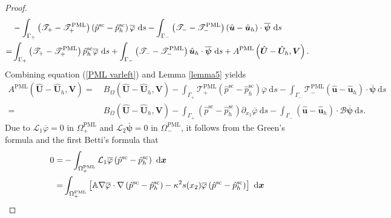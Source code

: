 \documentclass[10pt,a4paper]{amsart}
\begin{document}
\begin{proof}
\begin{align}
		&-\int_{\Gamma_+}\left(\mathscr{T}_+-\mathscr{T}_+^{\mathrm{PML}}\right)\left(\hat{p}^{\mathrm{sc}}-\hat{p}^{\mathrm{sc}}_h\right) \overline{\varphi} \mathrm{~d} s
		-\int_{\Gamma_-}\left(\mathscr{T}_--\mathscr{T}_-^{\mathrm{PML}}\right)\left(\hat{\boldsymbol{u}}-\hat{\boldsymbol{u}}_h\right) \cdot \overline{\boldsymbol{\psi}} \mathrm{~d} s \notag\\
		=&\int_{\Gamma_+}\left(\mathscr{T}_+-\mathscr{T}_+^{\mathrm{PML}}\right)\hat{p}^{\mathrm{sc}}_h \overline{\varphi} \mathrm{~d} s
		+\int_{\Gamma_-}\left(\mathscr{T}_--\mathscr{T}_-^{\mathrm{PML}}\right)\hat{\boldsymbol{u}}_h \cdot \overline{\boldsymbol{\psi}} \mathrm{~d} s +A^{\mathrm{PML}}\left(\hat{\boldsymbol{U}}-\hat{\boldsymbol{U}}_h, \boldsymbol{V}\right).\label{4.2.1}
	\end{align}
	Combining equation (\ref{PML varleft}) and Lemma \ref{lemma5} yields
	\begin{align*}
		A^{\mathrm{PML}}\left(\hat{\boldsymbol{U}}-\hat{\boldsymbol{U}}_h,\boldsymbol{V}\right)
		=&~B_{\Omega}\left(\hat{\boldsymbol{U}}-\hat{\boldsymbol{U}}_h, \boldsymbol{V}\right) -\int_{\Gamma_+}\mathscr{T}_+^{\mathrm{PML}}\left(\hat{p}^{\mathrm{sc}}-\hat{p}^{\mathrm{sc}}_h\right) \overline{\varphi} \mathrm{~d} s
		-\int_{\Gamma_-}\mathscr{T}_-^{\mathrm{PML}}\left(\hat{\boldsymbol{u}}-\hat{\boldsymbol{u}}_h\right) \cdot \overline{\boldsymbol{\psi}} \mathrm{~d} s\\
		=&~B_{\Omega}\left(\hat{\boldsymbol{U}}-\hat{\boldsymbol{U}}_h, \boldsymbol{V}\right) 
		- \int_{\Gamma_+}\left(\hat{p}^{\mathrm{sc}}-\hat{p}^{\mathrm{sc}}_h\right) \partial_{x_2} \overline{\varphi} \mathrm{~d} s
		- \int_{\Gamma_-} \left(\hat{\boldsymbol{u}}-\hat{\boldsymbol{u}}_h\right) \cdot \mathscr{B} \overline{\boldsymbol{\psi}} \mathrm{~d} s.
	\end{align*}
	Due to $\mathcal{L}_1 \overline{\varphi}=0$ in $\Omega^{\mathrm{PML}}_+$ and $\mathcal{L}_2 \overline{\boldsymbol{\psi}}=0$ in $\Omega^{\mathrm{PML}}_-$, it follows from the Green's formula and the first Betti's formula that
	\begin{align*}
		0 =& -\int_{\Omega^{\mathrm{PML}}_+}	\mathcal{L}_1\overline{\varphi}\left(\hat{p}^{\mathrm{sc}}-\hat{p}^{\mathrm{sc}}_h\right) \mathrm{~d} \boldsymbol{x} \notag\\
		=& \int_{\Omega^{\mathrm{PML}}_+}\left[\mathbb{A}\nabla \overline{\varphi} \cdot \nabla  \left(\hat{p}^{\mathrm{sc}}-\hat{p}^{\mathrm{sc}}_h\right)   
		- \kappa^2 s(x_2) \overline{\varphi}\left(\hat{p}^{\mathrm{sc}}-\hat{p}^{\mathrm{sc}}_h\right)\right] \mathrm{~d} \boldsymbol{x} 

\end{align*}
\end{proof}
\end{document}
